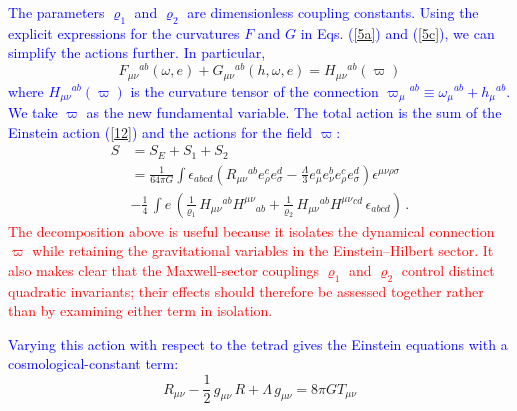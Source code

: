 \documentclass [prd,reprint,eqsecnum,nofootinbib]  {revtex4-1}
\newcommand{\corr}[1]{\textcolor{blue}{#1}}
\newcommand{\add}[1]{\textcolor{red}{#1}}
\begin{document}
\corr{The parameters $\varrho_1$ and $\varrho_2$ are dimensionless
coupling constants. Using the explicit expressions for the curvatures
$F$ and $G$ in Eqs. (\ref{5a}) and (\ref{5c}), we can simplify the
actions further. In particular,}
$$
F_{\mu\nu}{}^{ab}(\omega, e) + G_{\mu\nu}{}^{ab}(h,\omega,e) =
H_{\mu\nu}{}^{ab}(\varpi)
$$
\corr{where $H_{\mu\nu}{}^{ab}(\varpi)$ is the curvature tensor of the
connection $\varpi_{\mu}{}^{ab}\equiv
\omega_{\mu}{}^{ab}+h_{\mu}{}^{ab}$. We take $\varpi$ as the new
fundamental variable. The total action is the sum of the Einstein
action (\ref{12}) and the actions for the field $\varpi$:}
\begin{align}

S &= S_E + S_1 +S_2 \nonumber\\

&=\frac{1}{64\pi

G}\int\epsilon_{abcd}\left(R_{\mu\nu}{}^{ab}e_{\rho}^{c}e_{\sigma}^{d}

-\frac{\Lambda}{3}e_{\mu}^{a}e_{\nu}^{b}e_{\rho}^{ c}e_{\sigma}^{

d}\right)\epsilon^{\mu\nu\rho\sigma}\nonumber\\

&-\frac14\,\int  e\, \left(\frac1{\varrho_1}\, H_{\mu\nu}{}^{ab}

H^{\mu\nu}{}_{ab}+ \frac1{\varrho_2}\,H_{\mu\nu}{}^{ab}

H^{\mu\nu}{}^{cd}\,\epsilon_{abcd}\right)\, .\label{14}
\end{align}
\add{The decomposition above is useful because it isolates the dynamical
connection $\varpi$ while retaining the gravitational variables in the
Einstein--Hilbert sector. It also makes clear that the Maxwell-sector
couplings $\varrho_1$ and $\varrho_2$ control distinct quadratic
invariants; their effects should therefore be assessed together rather
than by examining either term in isolation.}




\corr{Varying this action with respect to the tetrad gives the Einstein
equations with a cosmological-constant term:}
\begin{equation}\label{15a}

    R_{\mu\nu}-\frac12\, g_{\mu\nu}\, R +\Lambda\, g_{\mu\nu}= 8\pi G T_{\mu\nu}

\end{equation}
\end{document}
